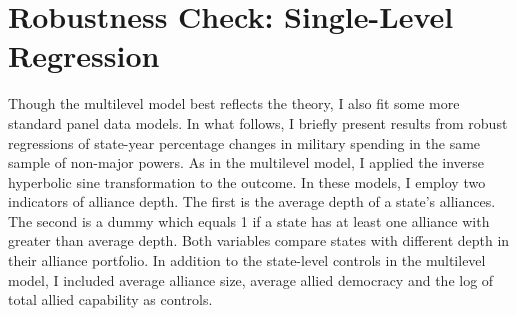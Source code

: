 \documentclass[12pt]{article}
\begin{document}
%
%
%
%
%
%
%

 


\section{Robustness Check: Single-Level Regression}


Though the multilevel model best reflects the theory, I also fit some more standard panel data models. 
In what follows, I briefly present results from robust regressions of state-year percentage changes in military spending in the same sample of non-major powers. 
As in the multilevel model, I applied the inverse hyperbolic sine transformation to the outcome. 
In these models, I employ two indicators of alliance depth. 
The first is the average depth of a state's alliances. 
The second is a dummy which equals 1 if a state has at least one alliance with greater than average depth. 
Both variables compare states with different depth in their alliance portfolio. 
In addition to the state-level controls in the multilevel model, I included average alliance size, average allied democracy and the log of total allied capability as controls. 
\end{document}
